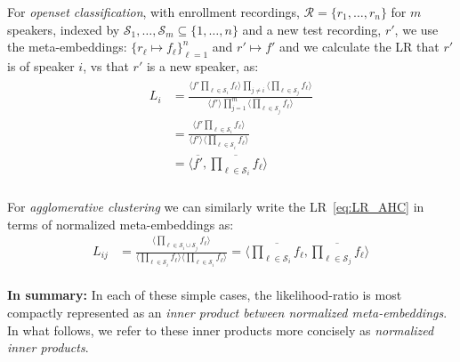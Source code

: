 \documentclass[a4paper,oneside,12pt,english]{report}
\def\expv#1#2{\bigl\langle#1\bigr\rangle_{#2}}
\def\Rset{\mathcal{R}}
\def\Sset{\mathcal{S}}
\def\dot#1#2{\expv{#1,#2}{}}
\def\normal#1{\overline{#1}}
\begin{document}
\noindent For \emph{openset classification}, with enrollment recordings, $\Rset=\{r_1,\ldots,r_n\}$ for $m$ speakers, indexed by $\Sset_1,\ldots,\Sset_m\subseteq\{1,\ldots,n\}$ and a new test recording, $r'$, we use the meta-embeddings: $\{r_\ell\mapsto f_\ell\}_{\ell=1}^n$ and $r'\mapsto f'$ and we calculate the LR that $r'$ is of speaker $i$, vs that $r'$ is a new speaker, as:
\begin{align}
\label{eq:lropenset}
\begin{split}
L_i &= \frac{\expv{f'\prod_{\ell\in\Sset_i} f_\ell}{}\prod_{j\ne i} \expv{\prod_{\ell\in\Sset_j} f_\ell}{}}
{\expv{f'}{}\prod_{j=1}^m \expv{\prod_{\ell\in\Sset_j} f_\ell}{}} \\
&= \frac{\expv{f'\prod_{\ell\in\Sset_i} f_\ell}{}}
{\expv{f'}{}\expv{\prod_{\ell\in\Sset_i} f_\ell}{}} \\
&= \dot{\normal{f'}}{\normal{\prod_{\ell\in\Sset_i} f_\ell}}
\end{split}
\end{align} \\

\noindent For \emph{agglomerative clustering} we can similarly write the LR~\eqref{eq:LR_AHC} in terms of normalized meta-embeddings as:
\begin{align}
L_{ij} &= \frac{\expv{\prod_{\ell\in\Sset_i\cup\Sset_j}f_\ell}{}}{\expv{\prod_{\ell\in\Sset_i}f_\ell}{}\expv{\prod_{\ell\in\Sset_i}f_\ell}{}} = \dot{\normal{\prod_{\ell\in\Sset_i}f_\ell}}{\normal{\prod_{\ell\in\Sset_j}f_\ell}}
\end{align}\\

\noindent \textbf{In summary:} In each of these simple cases, the likelihood-ratio is most compactly represented as an \emph{inner product between normalized meta-embeddings}. In what follows, we refer to these inner products more concisely as \emph{normalized inner products}. %
\end{document}
